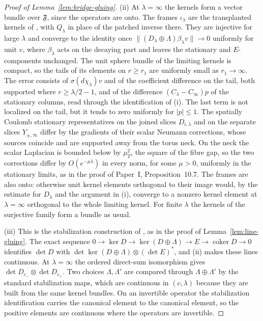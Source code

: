 \documentclass[11pt]{amsart}
\theoremstyle{definition}
\theoremstyle{remark}
\theoremstyle{plain}
\numberwithin{equation}{section}
\begin{document}
\begin{proof}[Proof of Lemma~\ref{lem:bridge-gluing}]
(ii) At $\lambda=\infty$ the kernels form a vector bundle over
$\mathfrak F$, since the operators are onto. The frames $\iota_\lambda$ are
the transplanted kernels of \cite[Step~3 of the proof of
Proposition~3.9]{Donaldson-book}, with $Q_\lambda$ in place of the patched
inverse there. They are injective for large $\lambda$ and converge to the
identity once $\|(D_\lambda\oplus\Lambda)\beta_\lambda v\|\to0$ uniformly for
unit $v$, where $\beta_\lambda$ acts on the decaying part and leaves the
stationary and $E$-components unchanged. The unit sphere bundle of the
limiting kernels is compact, so the tails of its elements on $r\ge r_1$
are uniformly small as $r_1\to\infty$. The error consists of
$\sigma(d\chi_\lambda)v$ and of the coefficient difference on the tail,
both supported where $r\ge\lambda/2-1$, and of the difference
$(C_\lambda-C_\infty)p$ of the stationary columns, read through the
identification of (i). The last term is not localized on the tail, but it
tends to zero uniformly for $|p|\le1$. The spatially Coulomb stationary
representatives on the joined slices $D_{i,\lambda}$ and on the separate
slices $Y_{\pm,\infty}$ differ by the gradients of their scalar Neumann
corrections, whose sources coincide and are supported away from the torus
neck. On the neck the scalar Laplacian is bounded below by $\mu_T^2$, the
square of the fibre gap, so the two corrections differ by
$O(e^{-\mu\lambda})$ in every norm, for some $\mu>0$, uniformly in the
stationary limits, as in the proof of Paper~I, Proposition~10.7. The frames
are also onto: otherwise unit kernel elements orthogonal to their image
would, by the estimate for $D_\lambda$ and the argument in (i), converge to
a nonzero kernel element at $\lambda=\infty$ orthogonal to the whole
limiting kernel. For finite $\lambda$ the kernels of the surjective family
form a bundle as usual.

(iii) This is the stabilization construction of \cite[Step~4 of the proof
of Proposition~3.9, and Proposition~5.11]{Donaldson-book}, as in the proof
of Lemma~\ref{lem:line-gluing}. The exact sequence
$0\to\ker D\to\ker(D\oplus\Lambda)\to E\to\operatorname{coker}D\to0$
identifies $\det D$ with $\det\ker(D\oplus\Lambda)\otimes(\det E)^*$,
and (ii) makes these lines continuous. At $\lambda=\infty$ the ordered
direct-sum isomorphism gives $\det D_{c_-}\otimes\det D_{c_+}$. Two choices
$\Lambda,\Lambda'$ are compared through $\Lambda\oplus\Lambda'$ by the
standard stabilization maps, which are continuous in $(c,\lambda)$ because
they are built from the same kernel bundles. On an invertible operator the
stabilization identification carries the canonical element to the
canonical element, so the positive elements are continuous where the
operators are invertible.


\end{proof}
\end{document}
